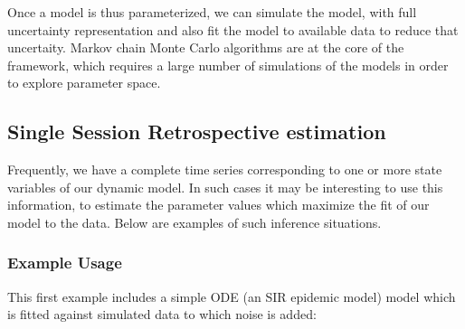 \documentclass[a4paper,10pt,english]{sphinxmanual}
\begin{document}
Once a model is thus parameterized, we can simulate the model, with full uncertainty representation and also fit the model to available data to reduce that uncertaity. Markov chain Monte Carlo algorithms are at the core of the framework, which requires a large number of simulations of the models in order to explore parameter space.


\subsection{Single Session Retrospective estimation}
\label{paramest:single-session-retrospective-estimation}
Frequently, we have a complete time series corresponding to one or more state variables of our dynamic model. In such cases it may be interesting to use this information, to estimate the parameter values which maximize the fit of our model to the data. Below are examples of such inference situations.


\subsubsection{Example Usage}
\label{paramest:example-usage}
This first example includes a simple ODE (an SIR epidemic model) model which is fitted against simulated data to which noise is added:
\end{document}
